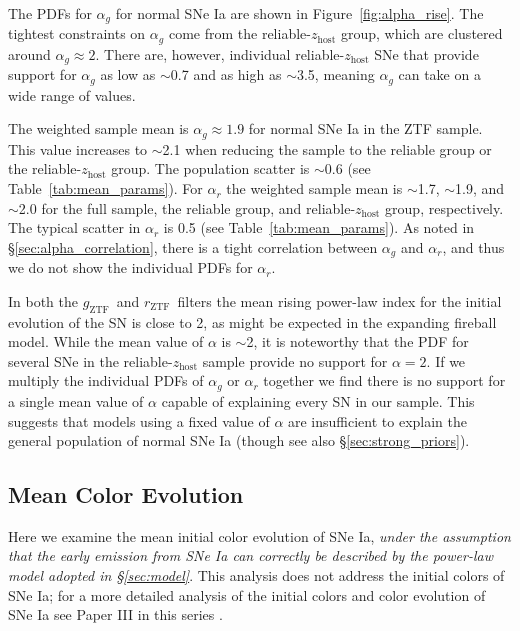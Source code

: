 \documentclass[twocolumn]{aastex63}
\newcommand{\rztf}{$r_\mathrm{ZTF}$}
\newcommand{\gztf}{$g_\mathrm{ZTF}$}
\begin{document}
The PDFs for $\alpha_g$ for normal SNe Ia are shown in
Figure~\ref{fig:alpha_rise}. The tightest constraints on $\alpha_g$ come from
the reliable-$z_\mathrm{host}$ group, which are clustered around $\alpha_g
\approx 2$. There are, however, individual reliable-$z_\mathrm{host}$ SNe that
provide support for $\alpha_g$ as low as $\sim$0.7 and as high as $\sim$3.5, meaning $\alpha_g$ can take on a wide range of values.

The weighted sample mean is $\alpha_g \approx 1.9$ for normal SNe Ia in the
ZTF sample. This value increases to $\sim$2.1 when reducing the sample to the
reliable group or the reliable-$z_\mathrm{host}$ group. The population scatter
is $\sim$0.6 (see Table~\ref{tab:mean_params}). For $\alpha_r$ the weighted
sample mean is $\sim$1.7, $\sim$1.9, and $\sim$2.0 for the full sample, the
reliable group, and reliable-$z_\mathrm{host}$ group, respectively. The
typical scatter in $\alpha_r$ is 0.5 (see Table~\ref{tab:mean_params}). As
noted in \S\ref{sec:alpha_correlation}, there is a tight correlation
between $\alpha_g$ and $\alpha_r$, and thus we do not show the individual PDFs
for $\alpha_r$.

In both the \gztf\ and \rztf\ filters the mean rising power-law index for the
initial evolution of the SN is close to 2, as might be expected in
the expanding fireball model. While the mean value of $\alpha$
is $\sim$2, it is noteworthy that the PDF for several SNe in the
reliable-$z_\mathrm{host}$ sample provide no support for $\alpha = 2$. If we
multiply the individual PDFs of $\alpha_g$ or $\alpha_r$ together we find
there is no support for a single mean value of $\alpha$ capable of explaining
every SN in our sample. This suggests that models using a fixed value of
$\alpha$ are insufficient to explain the general population of normal SNe Ia
(though see also \S\ref{sec:strong_priors}).



\subsection{Mean Color Evolution}\label{sec:colors}

Here we examine the mean initial color evolution of SNe Ia, \textit{under the
assumption that the early emission from SNe Ia can correctly be described by
the power-law model adopted in \S\ref{sec:model}}. This analysis does not
address the initial colors of SNe Ia; for a more detailed analysis of the
initial colors and color evolution of SNe Ia see Paper III in this series \citep{Bulla20}.
\end{document}
